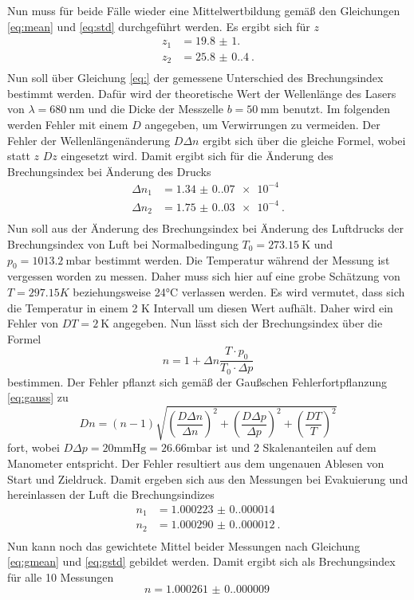 \noindent Nun muss für beide Fälle wieder eine Mittelwertbildung gemäß den Gleichungen 
\eqref{eq:mean} und \eqref{eq:std} durchgeführt werden. Es ergibt sich für $z$
\begin{align*}
  z_1&=\qty{19.8(1.0)}{}\\
  z_2&=\qty{25.8(0.4)}{}.\\
\end{align*}
Nun soll über Gleichung \eqref{eq:} der gemessene Unterschied des Brechungsindex bestimmt werden. 
Dafür wird der theoretische Wert der Wellenlänge des Lasers von $\lambda=\qty{680}{\nm}$
und die Dicke der Messzelle $b=\qty{50}{\mm}$ benutzt. Im folgenden werden Fehler mit einem $D$ angegeben, um 
Verwirrungen zu vermeiden. Der Fehler der Wellenlängenänderung $D\Delta n$ ergibt sich über die gleiche Formel, 
wobei statt $z$ $Dz$ eingesetzt wird.
Damit ergibt sich für die Änderung des Brechungsindex bei Änderung des Drucks
\begin{align*}
  \Delta n_1&=\qty{1.34(0.07)e-4}{}\\
  \Delta n_2&=\qty{1.75(0.03)e-4}{}.\\
\end{align*}
Nun soll aus der Änderung des Brechungsindex bei Änderung des Luftdrucks der Brechungsindex 
von Luft bei Normalbedingung $T_0=\qty{273.15}{\kelvin}$ und $p_0=\qty{1013.2}{}\text{mbar}$ bestimmt werden.
Die Temperatur während der Messung ist vergessen worden zu messen. Daher muss sich hier auf eine grobe Schätzung von 
$T=297.15K$ beziehungsweise 24°C verlassen werden. Es wird vermutet, dass sich die Temperatur in einem 2 K Intervall um diesen Wert aufhält.
Daher wird ein Fehler von $DT=\qty{2}{\kelvin}$ angegeben.
Nun lässt sich der Brechungsindex über die Formel 
\begin{equation*}
  n=1+\Delta n \frac{T\cdot p_0}{T_0\cdot \Delta p}
\end{equation*}
bestimmen. Der Fehler pflanzt sich gemäß der Gaußschen Fehlerfortpflanzung \eqref{eq:gauss} zu 
\begin{equation}
    Dn= (n-1)\sqrt{\left(\frac{D\Delta n}{\Delta n}\right)^2+\left(\frac{D\Delta p}{\Delta p}\right)^2+\left(\frac{DT}{T}\right)^2}
\end{equation}
fort, wobei $D\Delta p=20\text{mmHg}=26.66\text{mbar}$ ist und 2 Skalenanteilen auf dem Manometer entspricht. Der Fehler 
resultiert aus dem ungenauen Ablesen von Start und Zieldruck. 
Damit ergeben sich aus den Messungen bei Evakuierung und hereinlassen der Luft die 
Brechungsindizes 
\begin{align*}
  n_1&=\qty{1.000223(0.000014)}{}\\
  n_2&=\qty{1.000290(0.000012)}{}.\\
\end{align*}
Nun kann noch das gewichtete Mittel beider Messungen nach Gleichung \eqref{eq:gmean} und \eqref{eq:gstd} gebildet werden. Damit ergibt sich als 
Brechungsindex für alle 10 Messungen
\begin{equation*}
    n=\qty{1.000261(0.000009)}{}
\end{equation*}
